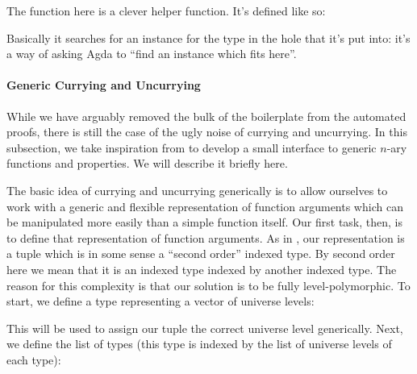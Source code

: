 

The  function here is a clever helper function.
It's defined like so:


Basically it searches for an instance for the type in the hole that it's put
into: it's a way of asking Agda to ``find an instance which fits here''.
\paragraph{Generic Currying and Uncurrying}
While we have arguably removed the bulk of the boilerplate from the automated
proofs, there is still the case of the ugly noise of currying and uncurrying.
In this subsection, we take inspiration from
\citet{allaisGenericLevelPolymorphic2019} to develop a small interface to generic
\(n\)-ary functions and properties.
We will describe it briefly here.

The basic idea of currying and uncurrying generically is to allow ourselves to
work with a generic and flexible representation of function arguments which can
be manipulated more easily than a simple function itself.
Our first task, then, is to define that representation of function arguments.
As in \citet{allaisGenericLevelPolymorphic2019}, our representation is a tuple
which is in some sense a ``second order'' indexed type.
By second order here we mean that it is an indexed type indexed by another
indexed type.
The reason for this complexity is that our solution is to be fully
level-polymorphic.
To start, we define a type representing a vector of universe levels:

\begin{minipage}{\linewidth}
  \begin{multicols}{2}
    
     \columnbreak
    
     \vspace{\baselineskip}
  \end{multicols}
\end{minipage}

This will be used to assign our tuple the correct universe level generically.
Next, we define the list of types (this type is indexed by the list of universe
levels of each type):


